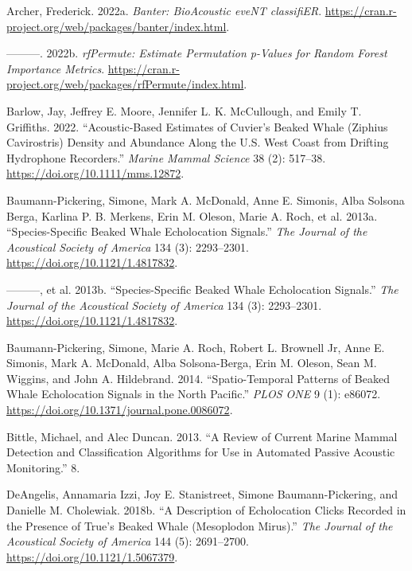 \documentclass[
  letterpaper,
  DIV=11,
  numbers=noendperiod]{scrartcl}
\newlength{\cslhangindent}
\newlength{\cslentryspacingunit} %
\newenvironment{CSLReferences}[2] %
 {%
  \setlength{\parindent}{0pt}
  \ifodd #1
  \let\oldpar\par
  \def\par{\hangindent=\cslhangindent\oldpar}
  \fi
  \setlength{\parskip}{#2\cslentryspacingunit}
 }%
 {}
\begin{document}
\hypertarget{refs}{}
\begin{CSLReferences}{1}{0}
\leavevmode{}%
Archer, Frederick. 2022a. \emph{Banter: BioAcoustic eveNT classifiER}.
\url{https://cran.r-project.org/web/packages/banter/index.html}.

\leavevmode{}%
---------. 2022b. \emph{rfPermute: Estimate Permutation p-Values for
Random Forest Importance Metrics}.
\url{https://cran.r-project.org/web/packages/rfPermute/index.html}.

\leavevmode{}%
Barlow, Jay, Jeffrey E. Moore, Jennifer L. K. McCullough, and Emily T.
Griffiths. 2022. {``Acoustic-Based Estimates of Cuvier's Beaked Whale
(Ziphius Cavirostris) Density and Abundance Along the U.S. West Coast
from Drifting Hydrophone Recorders.''} \emph{Marine Mammal Science} 38
(2): 517--38. \url{https://doi.org/10.1111/mms.12872}.

\leavevmode{}%
Baumann-Pickering, Simone, Mark A. McDonald, Anne E. Simonis, Alba
Solsona Berga, Karlina P. B. Merkens, Erin M. Oleson, Marie A. Roch, et
al. 2013a. {``Species-Specific Beaked Whale Echolocation Signals.''}
\emph{The Journal of the Acoustical Society of America} 134 (3):
2293--2301. \url{https://doi.org/10.1121/1.4817832}.

\leavevmode{}%
---------, et al. 2013b. {``Species-Specific Beaked Whale Echolocation
Signals.''} \emph{The Journal of the Acoustical Society of America} 134
(3): 2293--2301. \url{https://doi.org/10.1121/1.4817832}.

\leavevmode{}%
Baumann-Pickering, Simone, Marie A. Roch, Robert L. Brownell Jr, Anne E.
Simonis, Mark A. McDonald, Alba Solsona-Berga, Erin M. Oleson, Sean M.
Wiggins, and John A. Hildebrand. 2014. {``Spatio-Temporal Patterns of
Beaked Whale Echolocation Signals in the North Pacific.''} \emph{PLOS
ONE} 9 (1): e86072. \url{https://doi.org/10.1371/journal.pone.0086072}.

\leavevmode{}%
Bittle, Michael, and Alec Duncan. 2013. {``A Review of Current Marine
Mammal Detection and Classification Algorithms for Use in Automated
Passive Acoustic Monitoring.''} 8.

\leavevmode{}%
DeAngelis, Annamaria Izzi, Joy E. Stanistreet, Simone Baumann-Pickering,
and Danielle M. Cholewiak. 2018b. {``A Description of Echolocation
Clicks Recorded in the Presence of True's Beaked Whale (Mesoplodon
Mirus).''} \emph{The Journal of the Acoustical Society of America} 144
(5): 2691--2700. \url{https://doi.org/10.1121/1.5067379}.


\end{CSLReferences}
\end{document}
